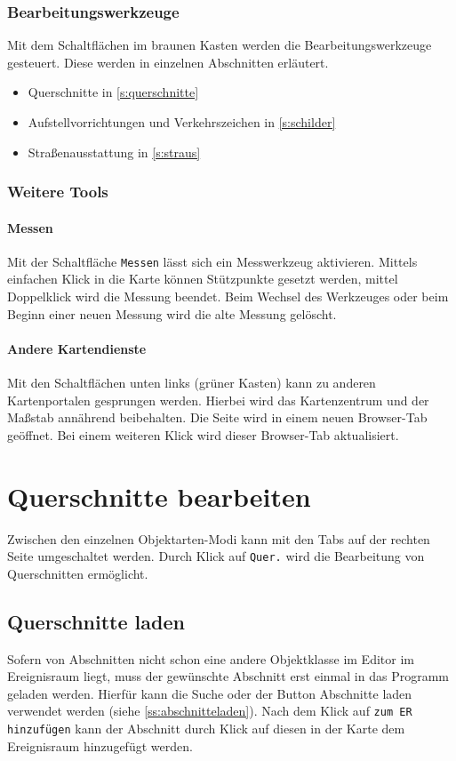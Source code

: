 \documentclass[a4paper,11pt,bibliography=totoc, listof=totoc,titlepage]{scrartcl}
\begin{document}
\subsubsection{Bearbeitungswerkzeuge}
Mit dem Schaltflächen im braunen Kasten werden die Bearbeitungswerkzeuge gesteuert. Diese werden in einzelnen Abschnitten erläutert.

\begin{itemize}
    \item \Gls{Querschnitt}e in \autoref{s:querschnitte}
    \item Aufstellvorrichtungen und Verkehrszeichen in \autoref{s:schilder}
    \item Straßenausstattung in \autoref{s:straus}
\end{itemize}

\subsubsection{Weitere Tools}
\paragraph{Messen}
Mit der Schaltfläche \verb|Messen| lässt sich ein Messwerkzeug aktivieren. Mittels einfachen Klick in die Karte können Stützpunkte gesetzt werden, mittel Doppelklick wird die Messung beendet. Beim Wechsel des Werkzeuges oder beim Beginn einer neuen Messung wird die alte Messung gelöscht.

\paragraph{Andere Kartendienste}
Mit den Schaltflächen unten links (grüner Kasten) kann zu anderen Kartenportalen gesprungen werden. Hierbei wird das Kartenzentrum und der Maßstab annährend beibehalten. Die Seite wird in einem neuen Browser-Tab geöffnet. Bei einem weiteren Klick wird dieser Browser-Tab aktualisiert.

\section{Querschnitte bearbeiten}
\label{s:querschnitte}

Zwischen den einzelnen Objektarten-Modi kann mit den Tabs auf der rechten Seite umgeschaltet werden. Durch Klick auf \verb|Quer.| wird die Bearbeitung von \Gls{Querschnitt}en ermöglicht.

\subsection{Querschnitte laden}
Sofern von Abschnitten nicht schon eine andere Objektklasse im Editor im Ereignisraum liegt, muss der gewünschte Abschnitt erst einmal in das Programm geladen werden. Hierfür kann die Suche oder der Button Abschnitte laden verwendet werden (siehe \autoref{ss:abschnitteladen}). Nach dem Klick auf \verb|zum ER hinzufügen| kann der Abschnitt durch Klick auf diesen in der Karte dem Ereignisraum hinzugefügt werden.
\end{document}
